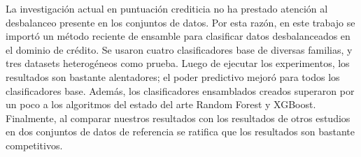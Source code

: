 \begin{resumen}
La investigación actual en puntuación crediticia no ha prestado atención al desbalanceo presente en los conjuntos de datos. Por esta razón, en este trabajo se importó un método reciente de ensamble para clasificar datos desbalanceados en el dominio de crédito. Se usaron cuatro clasificadores base de diversas familias, y tres datasets heterogéneos como prueba. Luego de ejecutar los experimentos, los resultados son bastante alentadores; el poder predictivo mejoró para todos los clasificadores base. Además, los clasificadores ensamblados creados superaron por un poco a los algoritmos del estado del arte Random Forest y XGBoost. Finalmente, al comparar nuestros resultados con los resultados de otros estudios en dos conjuntos de datos de referencia se ratifica que los resultados son bastante competitivos.
\end{resumen}

